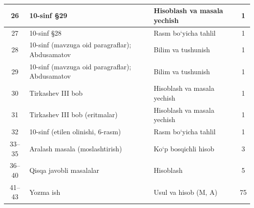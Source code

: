 \documentclass[11pt,a4paper]{article}
\begin{document}
$${\begin{longtable}{|c|p{7.2cm}|p{5.4cm}|c|}
26 & 10-sinf \S{}29 & Hisoblash va masala yechish & 1\\\hline
27 & 10-sinf \S{}28 & Rasm bo`yicha tahlil & 1\\\hline
28 & 10-sinf (mavzuga oid paragraflar); Abdusamatov & Bilim va tushunish & 1\\\hline
29 & 10-sinf (mavzuga oid paragraflar); Abdusamatov & Bilim va tushunish & 1\\\hline
30 & Tirkashev III bob & Hisoblash va masala yechish & 1\\\hline
31 & Tirkashev III bob (eritmalar) & Hisoblash va masala yechish & 1\\\hline
32 & 10-sinf (etilen olinishi, 6-rasm) & Rasm bo`yicha tahlil & 1\\\hline
33--35 & Aralash masala (moslashtirish) & Ko`p bosqichli hisob & 3\\\hline
36--40 & Qisqa javobli masalalar & Hisoblash & 5\\\hline
41--43 & Yozma ish & Usul va hisob (M, A) & 75\\\hline
\end{longtable}}
\end{document}
